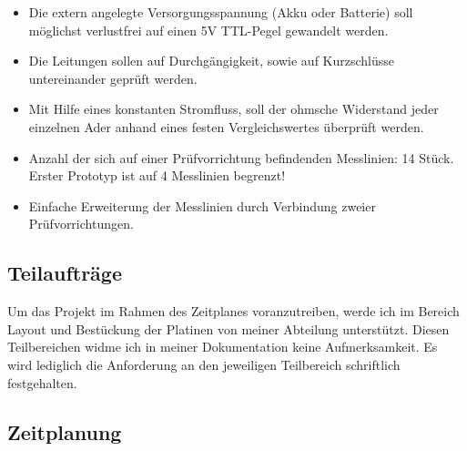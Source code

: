 \documentclass[a4paper,11pt]{scrartcl}
\begin{document}
\begin{itemize}
	\item{Die extern angelegte Versorgungsspannung (Akku oder Batterie) soll möglichst verlustfrei auf einen 5V TTL-Pegel gewandelt werden. }

	\item{Die Leitungen sollen auf Durchgängigkeit, sowie auf Kurzschlüsse untereinander geprüft werden.}
	
	\item{Mit Hilfe eines konstanten Stromfluss, soll der ohmsche Widerstand jeder einzelnen Ader anhand eines festen Vergleichswertes überprüft werden.}
	
	\item{Anzahl der sich auf einer Prüfvorrichtung befindenden Messlinien: 14 Stück.
Erster Prototyp ist auf 4 Messlinien begrenzt!}

	\item{Einfache Erweiterung der Messlinien durch Verbindung zweier Prüfvorrichtungen.}
\end{itemize}


\subsection{Teilaufträge}
Um das Projekt im Rahmen des Zeitplanes voranzutreiben, werde ich im Bereich Layout und Bestückung der Platinen von meiner Abteilung unterstützt. Diesen Teilbereichen widme ich in meiner Dokumentation keine Aufmerksamkeit. Es wird lediglich die Anforderung an den jeweiligen Teilbereich schriftlich festgehalten.

\newpage

\renewcommand{\arraystretch}{2}
\subsection{Zeitplanung}
\end{document}
